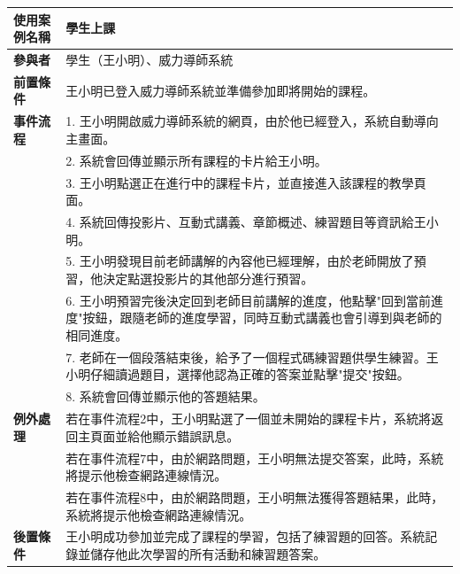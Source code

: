 \documentclass[12pt]{article}
\begin{document}
\begin{table}[H]
  \centering
  \begin{tabular}{|l|p{14cm}|}
  \hline
  \textbf{使用案例名稱} & 學生上課 \\ 
  \hline
  \textbf{參與者} & 學生（王小明）、威力導師系統 \\ 
  \hline
  \textbf{前置條件} & 王小明已登入威力導師系統並準備參加即將開始的課程。 \\ 
  \hline
  \textbf{事件流程} 
  & 1. 王小明開啟威力導師系統的網頁，由於他已經登入，系統自動導向主畫面。 \\
  & 2. 系統會回傳並顯示所有課程的卡片給王小明。 \\
  & 3. 王小明點選正在進行中的課程卡片，並直接進入該課程的教學頁面。 \\
  & 4. 系統回傳投影片、互動式講義、章節概述、練習題目等資訊給王小明。 \\
  & 5. 王小明發現目前老師講解的內容他已經理解，由於老師開放了預習，他決定點選投影片的其他部分進行預習。 \\
  & 6. 王小明預習完後決定回到老師目前講解的進度，他點擊"回到當前進度"按鈕，跟隨老師的進度學習，同時互動式講義也會引導到與老師的相同進度。 \\
  & 7. 老師在一個段落結束後，給予了一個程式碼練習題供學生練習。王小明仔細讀過題目，選擇他認為正確的答案並點擊"提交"按鈕。 \\ 
  & 8. 系統會回傳並顯示他的答題結果。 \\
  \hline
  \textbf{例外處理} 
  & 若在事件流程2中，王小明點選了一個並未開始的課程卡片，系統將返回主頁面並給他顯示錯誤訊息。 \\
  & 若在事件流程7中，由於網路問題，王小明無法提交答案，此時，系統將提示他檢查網路連線情況。 \\
  & 若在事件流程8中，由於網路問題，王小明無法獲得答題結果，此時，系統將提示他檢查網路連線情況。 \\
  \hline
  \textbf{後置條件} 
  & 王小明成功參加並完成了課程的學習，包括了練習題的回答。系統記錄並儲存他此次學習的所有活動和練習題答案。 \\
  \hline
  \end{tabular}
\end{table}
\end{document}
